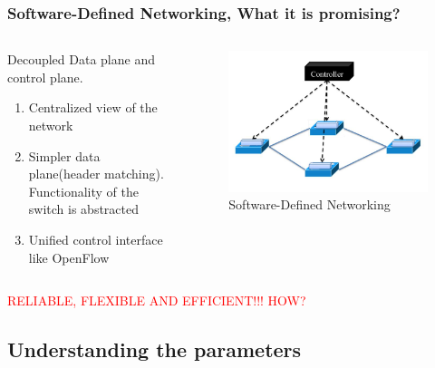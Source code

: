 \documentclass{beamer}
\begin{document}
\begin{frame}
	\frametitle{Software-Defined Networking, What it is promising?}
	\begin{columns}[T] %
		\begin{column}[T]{7.5cm} 
			Decoupled Data plane and control plane.
			\begin{enumerate}
				\item Centralized view of the network
				\item Simpler data plane(header matching). Functionality of the switch is abstracted
				\item Unified control interface like OpenFlow
			\end{enumerate}
		\end{column}
		\begin{column}[T]{5cm} 
			\begin{figure}
				\includegraphics[scale=0.25]{2}
				\caption{Software-Defined Networking}
			\end{figure}
		\end{column}
	\end{columns}
	\medskip
	\textcolor{red}{RELIABLE, FLEXIBLE AND EFFICIENT!!! HOW?}
\end{frame}

\subsection{Understanding the parameters}
\end{document}
